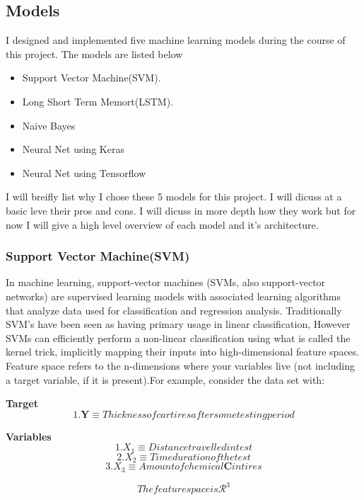 \subsection{Models}
I designed and implemented five machine learning models during the course of this project. The models are listed below 
\begin{itemize}
	\item Support Vector Machine(SVM).
	\item Long Short Term Memort(LSTM).
	\item Naive Bayes 
	\item Neural Net using Keras
	\item Neural Net using Tensorflow
\end{itemize}

I will breifly list why I chose these 5 models for this project. I will dicuss at a basic leve their pros and cons. I will dicuss in more depth how they work but for now I will give a high level overview of each model and it's architecture.

\subsubsection{Support Vector Machine(SVM)}
In machine learning, support-vector machines (SVMs, also support-vector networks) are supervised learning models with associated learning algorithms that analyze data used for classification and regression analysis. Traditionally SVM's have been seen as having primary usage in linear classification, However SVMs can efficiently perform a non-linear classification using what is called the kernel trick, implicitly mapping their inputs into high-dimensional feature spaces. Feature space refers to the n-dimensions where your variables live (not including a target variable, if it is present).For example, consider the data set with:

\textbf{Target} 
$$1. \textbf{Y} \equiv Thickness of car tires after some testing period$$


\textbf{Variables} 
$$1. X_1 \equiv Distance travelled in test $$
$$2. X_2 \equiv Time duration of the test $$
$$3. X_3 \equiv Amount of chemical \textbf{C} in tires$$

$$The feature space is \mathcal{R^3} $$



